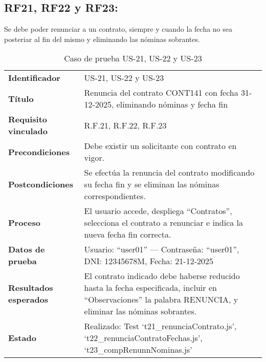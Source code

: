 \subsection*{RF21, RF22 y RF23:} Se debe poder renunciar a un contrato, siempre y cuando la fecha no sea posteriar al fin del mismo y eliminando las nóminas sobrantes.
\begin{table}[H]
	\centering
	\small
	\caption{Caso de prueba US-21, US-22 y US-23}
	\label{tab:caso_uso21}
	\begin{tabular}{>{\bfseries}l p{11cm}}
		Identificador & US-21, US-22 y US-23 \\
		Título & Renuncia del contrato CONT141 con fecha 31-12-2025, eliminando nóminas y fecha fin \\
		Requisito vinculado & R.F.21, R.F.22, R.F.23 \\
		Precondiciones & Debe existir un solicitante con contrato en vigor. \\
		Postcondiciones & Se efectúa la renuncia del contrato modificando su fecha fin y se eliminan las nóminas correspondientes. \\
		Proceso & El usuario accede, despliega “Contratos”, selecciona el contrato a renunciar e indica la nueva fecha fin correcta. \\
		Datos de prueba & Usuario: “user01” — Contraseña: “user01”, DNI: 12345678M, Fecha: 21-12-2025 \\
		Resultados esperados & El contrato indicado debe haberse reducido hasta la fecha especificada, incluir en “Observaciones” la palabra RENUNCIA, y eliminar las nóminas sobrantes. \\
		Estado & Realizado: Test `t21\_renunciaContrato.js', `t22\_renunciaContratoFechas.js', `t23\_compRenunnNominas.js' \\
	\end{tabular}
\end{table}

